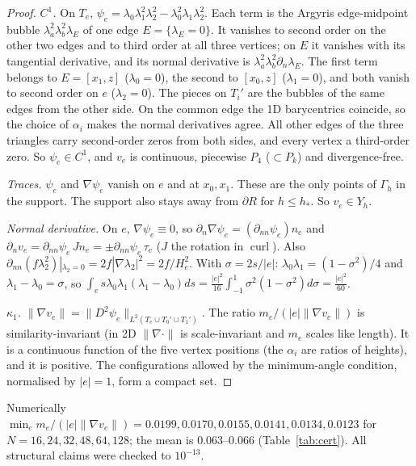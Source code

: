 \documentclass[11pt]{article}
\theoremstyle{remark}
\newcommand{\Gh}{\Gamma_h}
\newcommand{\Yh}{Y_h}
\newcommand{\norm}[1]{\|#1\|}
\newcommand{\dn}{\partial_n}
\begin{document}
\begin{proof}
\emph{$C^1$.} On $T_e$, $\psi_e=\lambda_0\lambda_1^2\lambda_2^2-\lambda_0^2\lambda_1\lambda_2^2$. Each term is the Argyris edge-midpoint bubble $\lambda_a^2\lambda_b^2\lambda_E$ of one edge $E=\{\lambda_E=0\}$. It vanishes to second order on the other two edges and to third order at all three vertices; on $E$ it vanishes with its tangential derivative, and its normal derivative is $\lambda_a^2\lambda_b^2\dn\lambda_E$. The first term belongs to $E=[x_1,z]$ ($\lambda_0=0$), the second to $[x_0,z]$ ($\lambda_1=0$), and both vanish to second order on $e$ ($\lambda_2=0$). The pieces on $T_i'$ are the bubbles of the same edges from the other side. On the common edge the 1D barycentrics coincide, so the choice of $\alpha_i$ makes the normal derivatives agree. All other edges of the three triangles carry second-order zeros from both sides, and every vertex a third-order zero. So $\psi_e\in C^1$, and $v_e$ is continuous, piecewise $P_4$ ($\subset P_k$) and divergence-free.

\emph{Traces.} $\psi_e$ and $\nabla\psi_e$ vanish on $e$ and at $x_0,x_1$. These are the only points of $\Gh$ in the support. The support also stays away from $\partial R$ for $h\le h_\ast$. So $v_e\in\Yh$.

\emph{Normal derivative.} On $e$, $\nabla\psi_e\equiv0$, so $\dn\nabla\psi_e=(\partial_{nn}\psi_e)n_e$ and $\dn v_e=\partial_{nn}\psi_e\,Jn_e=\pm\partial_{nn}\psi_e\,\tau_e$ ($J$ the rotation in $\operatorname{curl}$). Also $\partial_{nn}(f\lambda_2^2)|_{\lambda_2=0}=2f|\nabla\lambda_2|^2=2f/H_e^2$. With $\sigma=2s/|e|$: $\lambda_0\lambda_1=(1-\sigma^2)/4$ and $\lambda_1-\lambda_0=\sigma$, so $\int_es\lambda_0\lambda_1(\lambda_1-\lambda_0)ds=\frac{|e|^2}{16}\int_{-1}^1\sigma^2(1-\sigma^2)d\sigma=\frac{|e|^2}{60}$.

\emph{$\kappa_1$.} $\norm{\nabla v_e}=\norm{D^2\psi_e}_{L^2(T_e\cup T_0'\cup T_1')}$. The ratio $m_e/(|e|\norm{\nabla v_e})$ is similarity-invariant (in 2D $\norm{\nabla\cdot}$ is scale-invariant and $m_e$ scales like length). It is a continuous function of the five vertex positions (the $\alpha_i$ are ratios of heights), and it is positive. The configurations allowed by the minimum-angle condition, normalised by $|e|=1$, form a compact set.
\end{proof}
Numerically $\min_e m_e/(|e|\norm{\nabla v_e})=0.0199,0.0170,0.0155,0.0141,0.0134,0.0123$ for $N=16,24,32,48,64,128$; the mean is $0.063$--$0.066$ (Table~\ref{tab:cert}). All structural claims were checked to $10^{-13}$.
\end{document}
